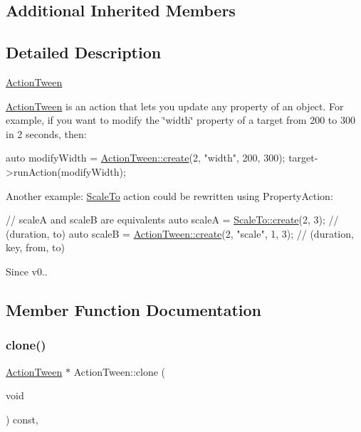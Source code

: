 \subsection*{Additional Inherited Members}


\subsection{Detailed Description}
\hyperlink{classActionTween}{Action\+Tween}

\hyperlink{classActionTween}{Action\+Tween} is an action that lets you update any property of an object. For example, if you want to modify the \char`\"{}width\char`\"{} property of a target from 200 to 300 in 2 seconds, then\+:


\begin{DoxyCode}
\textcolor{keyword}{auto} modifyWidth = \hyperlink{classActionTween_ac687f53bff3399fef691582730a185e8}{ActionTween::create}(2, \textcolor{stringliteral}{"width"}, 200, 300);
target->runAction(modifyWidth);
\end{DoxyCode}


Another example\+: \hyperlink{classScaleTo}{Scale\+To} action could be rewritten using Property\+Action\+:


\begin{DoxyCode}
\textcolor{comment}{// scaleA and scaleB are equivalents}
\textcolor{keyword}{auto} scaleA = \hyperlink{classScaleTo_a6052ccf3f347dfabeb13db58de42e648}{ScaleTo::create}(2, 3);                 \textcolor{comment}{// (duration, to)}
\textcolor{keyword}{auto} scaleB = \hyperlink{classActionTween_ac687f53bff3399fef691582730a185e8}{ActionTween::create}(2, \textcolor{stringliteral}{"scale"}, 1, 3); \textcolor{comment}{// (duration, key, from, to)}
\end{DoxyCode}


\begin{DoxySince}{Since}
v0.. 
\end{DoxySince}


\subsection{Member Function Documentation}
\mbox{\label{classActionTween_aff915e251fce5eaac6c44871407c62e4}} 
\subsubsection{\texorpdfstring{clone()}{clone()}\hspace{0.1cm}{\footnotesize\ttfamily [1/2]}}
{\footnotesize\ttfamily \hyperlink{classActionTween}{Action\+Tween} $\ast$ Action\+Tween\+::clone (\begin{DoxyParamCaption}\item[{void}]{ }\end{DoxyParamCaption}) const\hspace{0.3cm}{\ttfamily [override]}, {\ttfamily [virtual]}}

